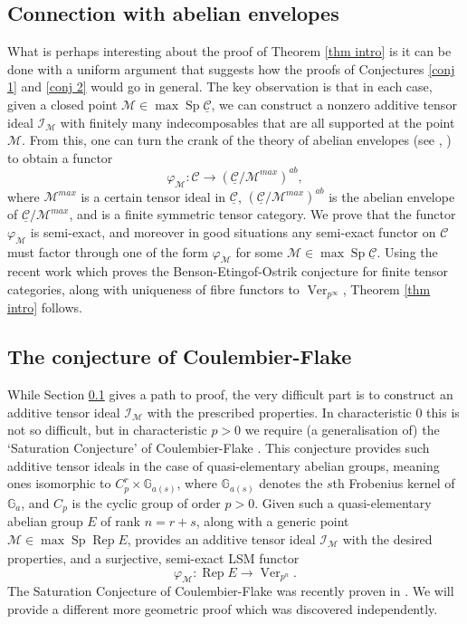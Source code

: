 \documentclass[11pt]{amsart}
\def\G{\mathbb{G}}
\def\MM{\mathcal{M}}
\def\Cs{\mathcal{C}}
\def\II{\mathcal{I}}
\def\Cs{\mathscr{C}}
\def\Rep{\operatorname{Rep}}
\def\Ver{\operatorname{Ver}}
\def\ul{\underline}
\def\Sp{\operatorname{Sp}}
\theoremstyle{definition}
\theoremstyle{remark}
\numberwithin{equation}{section}
\begin{document}
\subsection{Connection with abelian envelopes}\label{intro ab envelopes} What is perhaps interesting about the proof of Theorem \ref{thm intro} is it can be done with a uniform argument that suggests how the proofs of Conjectures \ref{conj 1} and \ref{conj 2} would go in general.  The key observation is that in each case, given a closed point $\MM\in\max\Sp\ul{\Cs}$, we can construct a nonzero additive tensor ideal $\II_\MM$ with finitely many indecomposables that are all supported at the point $\MM$.  From this, one can turn the crank of the theory of abelian envelopes (see \cite[Thm.~2.4.1]{CEO}, \cite{St}) to obtain a functor
\[
\varphi_{\MM}:\Cs\to (\ul{\Cs}/\MM^{max})^{ab},
\]
where $\MM^{max}$ is a certain tensor ideal in $\ul{\Cs}$, $(\ul{\Cs}/\MM^{max})^{ab}$ is the abelian envelope of $\ul{\Cs}/\MM^{max}$, and is a finite symmetric tensor category.  We prove that the functor $\varphi_\MM$ is semi-exact, and moreover in good situations any semi-exact functor on $\Cs$ must factor through one of the form $\varphi_\MM$  for some $\MM\in\max\Sp\ul{\Cs}$.  Using the recent work \cite{CF2} which proves the Benson-Etingof-Ostrik conjecture for finite tensor categories, along with uniqueness of fibre functors to $\Ver_{p^\infty}$, Theorem \ref{thm intro} follows.

\subsection{The conjecture of Coulembier-Flake}  While Section \ref{intro ab envelopes} gives a path to proof, the very difficult part is to construct an additive tensor ideal $\II_\MM$ with the prescribed properties.  In characteristic 0 this is not so difficult, but in characteristic $p>0$ we require (a generalisation of) the `Saturation Conjecture' of Coulembier-Flake \cite[Conj.~5.4.2(1)]{CF}.  This conjecture provides such additive tensor ideals in the case of quasi-elementary abelian groups, meaning ones isomorphic to $C_p^r\times\G_{a(s)}$, where $\G_{a(s)}$ denotes the $s$th Frobenius kernel of $\G_a$, and $C_p$ is the cyclic group of order $p>0$.  Given such a quasi-elementary abelian group $E$ of rank $n=r+s$, along with a generic point $\MM\in\max\Sp\ul{\Rep E}$, \cite{CF} provides an additive tensor ideal $\II_\MM$ with the desired properties, and a surjective, semi-exact LSM functor
\[
\varphi_\MM:\Rep E\to\Ver_{p^n}.
\]
The Saturation Conjecture of Coulembier-Flake was recently proven in \cite{CF2}.  We will provide a different more geometric proof which was discovered independently.
\end{document}
